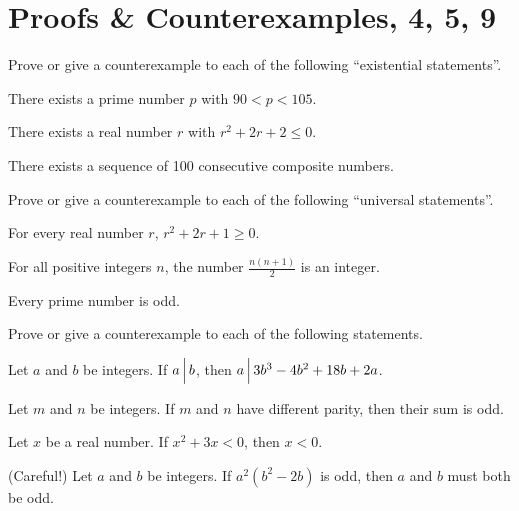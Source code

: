 \documentclass[12pt,letterpaper]{article}
\begin{document}
\section{Proofs \& Counterexamples, \framebox{\S} 4,  5,  9}%
\thispagestyle{fancy}

\begin{enumerate}
  \Problem Prove or give a counterexample to each of the following
  ``existential statements''. 
  \begin{enumerate}
    \Part  There exists a prime number $p$ with $90<p<105$. 
    \vfill

    \Part There exists a real number $r$ with $r^2+2r+2\le 0$.
    \vfill

    \Part There exists a sequence of 100 consecutive composite numbers.
    \vfill
  \end{enumerate}

  \Problem Prove or give a counterexample to each of the following
  ``universal statements''.
  \begin{enumerate}
    \Part For every real number $r$, $r^2 + 2r+1\ge0$. 
    \vfill

    \Part For all positive integers $n$, the number $\frac{n(n+1)}{2}$ is an integer.
    \vfill

    \Part Every prime number is odd.
    \vfill
  \end{enumerate}

\end{enumerate}
\newpage

Prove or give a counterexample to each of the following statements.
\begin{enumerate}
  \Problem Let $a$ and $b$ be integers. If $a\,\Big{|}\,b$, then
  $a\,\Big{|}\,3b^3-4b^2+18b+2a$.  
  \vfill

  \Problem Let $m$ and $n$ be integers.  If $m$ and $n$ have different
  parity, then their sum is odd.  
  \vfill

  \Problem Let $x$ be a real number.  If $x^2+3x<0$, then $x<0$.
  \vfill

  \Problem (Careful!) Let $a$ and $b$ be integers.  If $a^2(b^2-2b)$
  is odd, then $a$ and $b$ must both be odd.

  \vfill
\end{enumerate}



\newpage
{}%
\lhead{}
\rhead{}
\thispagestyle{fancy}
\end{document}
